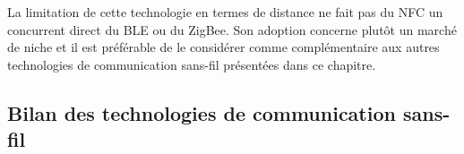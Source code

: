 La limitation de cette technologie en termes de distance ne fait pas du \acs{NFC} un concurrent direct du \acs{BLE} ou du ZigBee. Son adoption concerne plutôt un marché de niche et il est préférable de le considérer comme complémentaire aux autres technologies de communication sans-fil présentées dans ce chapitre.

\subsection{Bilan des technologies de communication sans-fil}

\begin{table}[b!]
    \caption{Caractéristiques des différentes technologies de communication sans-fil employées par les \textit{wearable devices}}
    \label{tab:wireless_tech}
\end{table}

